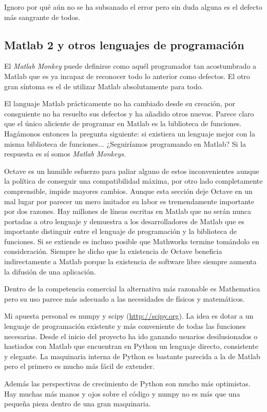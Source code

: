 Ignoro por qué aún no se ha subsanado el error pero sin duda alguna es
el defecto más sangrante de todos.

\subsection{Matlab 2 y otros lenguajes de programación}

El \emph{Matlab Monkey} puede definirse como aquél programador tan
acostumbrado a Matlab que es ya incapaz de reconocer todo lo anterior
como defectos.  El otro gran síntoma es el de utilizar Matlab
absolutamente para todo.

El languaje Matlab prácticamente no ha cambiado desde su creación, por
consguiente no ha resuelto sus defectos y ha añadido otros
nuevos. Parece claro que el único aliciente de programar en Matlab es
la biblioteca de funciones.  Hagámonos entonces la pregunta siguiente:
si existiera un lenguaje mejor con la misma biblioteca de
funciones... ¿Seguiríamos programando en Matlab?  Si la respuesta es
sí somos \emph{Matlab Monkeys}.

Octave es un humilde esfuerzo para paliar alguno de estos
inconvenientes aunque la política de conseguir una compatibilidad
máxima, por otro lado completamente comprensible, impide mayores
cambios.  Aunque esta sección deje Octave en un mal lugar por parecer
un mero imitador su labor es tremendamente importante por dos
razones. Hay millones de líneas escritas en Matlab que no serán nunca
portadas a otro lenguaje y demuestra a los desarrolladores de Matlab
que es importante distinguir entre el lenguaje de programación y la
biblioteca de funciones.  Si se extiende es incluso posible que
Mathworks termine tomándolo en consideración. Siempre he dicho que la
existencia de Octave beneficia indirectamente a Matlab porque la
existencia de software libre siempre aumenta la difusión de una
aplicación.

Dentro de la competencia comercial la alternativa más
razonable es Mathematica pero su uso parece más adecuado a las
necesidades de físicos y matemáticos.

Mi apuesta personal es numpy y scipy (\url{http://scipy.org}). La idea
es dotar a un lenguaje de programación existente y más conveniente de
todas las funciones necesarias. Desde el inicio del proyecto ha ido
ganando usuarios desilusionados o hastiados con Matlab que encuentran
en Python un lenguaje directo, consistente y elegante.  La maquinaria
interna de Python es bastante parecida a la de Matlab pero el primero
es mucho más fácil de extender.

Además las perspectivas de crecimiento de Python son mucho más
optimistas.  Hay muchas más manos y ojos sobre el código y numpy no es
más que una pequeña pieza dentro de una gran maquinaria.
